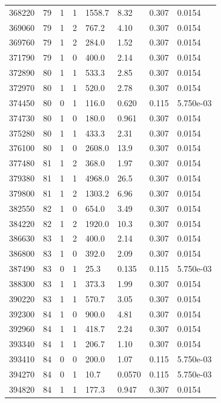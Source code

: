 \documentclass[preview]{standalone}
\begin{document}
{{{{{{{{{{\begin{tabular}{L{1.2cm}C{1.2cm} C{0.3cm}C{0.5cm} C{1.4cm}C{1.4cm} C{1.4cm}C{1.4cm}}
  368220  &    79  & 1     &  1 &  1558.7  & 8.32  & 0.307 &  0.0154   \\ 
  369060  &    79  & 1     &  2 &  767.2  & 4.10  & 0.307 &  0.0154   \\ 
  369760  &    79  & 1     &  2 &  284.0  & 1.52  & 0.307 &  0.0154   \\ 
  371790  &    79  & 1     &  0 &  400.0  & 2.14  & 0.307 &  0.0154   \\ 
  372890  &    80  & 1     &  1 &  533.3  & 2.85  & 0.307 &  0.0154   \\ 
  372970  &    80  & 1     &  1 &  520.0  & 2.78  & 0.307 &  0.0154   \\ 
  374450  &    80  & 0     &  1 &  116.0  & 0.620  & 0.115 &  5.750e-03   \\ 
  374730  &    80  & 1     &  0 &  180.0  & 0.961  & 0.307 &  0.0154   \\ 
  375280  &    80  & 1     &  1 &  433.3  & 2.31  & 0.307 &  0.0154   \\ 
  376100  &    80  & 1     &  0 &  2608.0  & 13.9  & 0.307 &  0.0154   \\ 
  377480  &    81  & 1     &  2 &  368.0  & 1.97  & 0.307 &  0.0154   \\ 
  379380  &    81  & 1     &  1 &  4968.0  & 26.5  & 0.307 &  0.0154   \\ 
  379800  &    81  & 1     &  2 &  1303.2  & 6.96  & 0.307 &  0.0154   \\ 
  382550  &    82  & 1     &  0 &  654.0  & 3.49  & 0.307 &  0.0154   \\ 
  384220  &    82  & 1     &  2 &  1920.0  & 10.3  & 0.307 &  0.0154   \\ 
  386630  &    83  & 1     &  2 &  400.0  & 2.14  & 0.307 &  0.0154   \\ 
  386800  &    83  & 1     &  0 &  392.0  & 2.09  & 0.307 &  0.0154   \\ 
  387490  &    83  & 0     &  1 &  25.3  & 0.135  & 0.115 &  5.750e-03   \\ 
  388300  &    83  & 1     &  1 &  373.3  & 1.99  & 0.307 &  0.0154   \\ 
  390220  &    83  & 1     &  1 &  570.7  & 3.05  & 0.307 &  0.0154   \\ 
  392300  &    84  & 1     &  0 &  900.0  & 4.81  & 0.307 &  0.0154   \\ 
  392960  &    84  & 1     &  1 &  418.7  & 2.24  & 0.307 &  0.0154   \\ 
  393340  &    84  & 1     &  1 &  206.7  & 1.10  & 0.307 &  0.0154   \\ 
  393410  &    84  & 0     &  0 &  200.0  & 1.07  & 0.115 &  5.750e-03   \\ 
  394270  &    84  & 0     &  1 &  10.7  & 0.0570  & 0.115 &  5.750e-03   \\ 
  394820  &    84  & 1     &  1 &  177.3  & 0.947  & 0.307 &  0.0154   \\ 
\hline 
\end{tabular} 

}}}}}}}}}}
\end{document}
